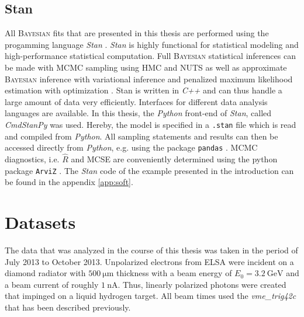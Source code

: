 \subsection{Stan}
All \textsc{Bayesian} fits that are presented in this thesis are performed using the progamming language \emph{Stan} \cite{stan}. \emph{Stan} is highly functional for statistical modeling and high-performance statistical computation. Full \textsc{Bayesian} statistical inferences can be made with MCMC sampling using HMC and NUTS as well as approximate \textsc{Bayesian} inference with variational inference and penalized maximum likelihood estimation with optimization \cite{stan}. Stan is written in \emph{C++} and can thus handle a large amount of data very efficiently. Interfaces for different data analysis languages are available. In this thesis, the \emph{Python} \cite{python} front-end of \emph{Stan}, called \emph{CmdStanPy} \cite{cmdstanpy} was used. Hereby, the model is specified in a \texttt{.stan} file which is read and compiled from \emph{Python}. All sampling statements and results can then be accessed directly from \emph{Python}, e.g. using the package \texttt{pandas} \cite{pandas}.  MCMC diagnostics, i.e. $\widehat{R}$ and MCSE are conveniently determined using the python package \texttt{ArviZ} \cite{arviz_2019}. The \emph{Stan} code of the example presented in the introduction can be found in the appendix \ref{app:soft}.
\section{Datasets}
The data that was analyzed in the course of this thesis was taken in the period of July 2013 to October 2013. Unpolarized electrons from ELSA were incident on a diamond radiator with $\SI{500}{\micro\meter}$ thickness with a beam energy of $E_0=\SI{3.2}{\giga\eV}$ and a beam current of roughly $\SI{1}{\nano\ampere}$. Thus, linearly polarized photons were created that impinged on a liquid hydrogen target. All beam times used the \emph{vme\_trig42c} that has been described previously.

